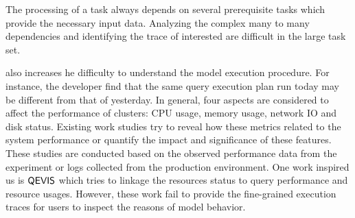 The processing of a task always depends on several prerequisite tasks which provide the necessary input data. Analyzing the complex many to many dependencies and identifying the trace of interested are difficult in the large task set.

 also increases he difficulty to understand the model execution procedure. For instance, the developer find that the same query execution plan run today may be different from that of yesterday. In general, four aspects are considered to affect the performance of clusters: CPU usage, memory usage, network IO and disk status. Existing work studies try to reveal how these metrics related to the system performance or quantify the impact and significance of these features. These studies are conducted based on the observed performance data from the experiment or logs collected from the production environment. One work inspired us is $\mathsf{QEVIS}$ which tries to linkage the resources status to query performance and resource usages. However, these work fail to provide the fine-grained execution traces for users to inspect the reasons of model behavior.

